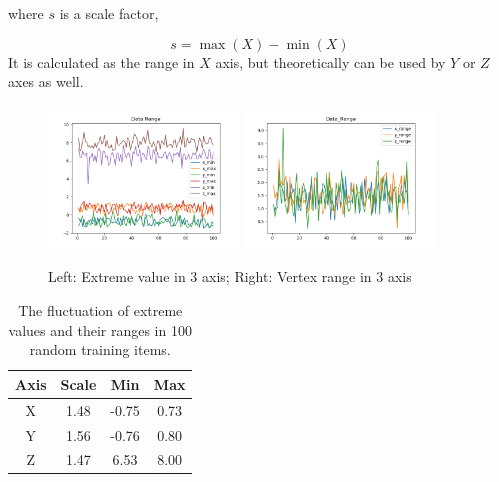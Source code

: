 \documentclass[border=15pt, multi, tikz]{article}
\newcommand{\tabhead}[1]{\textbf{#1}}
\begin{document}
where $ s $ is a scale factor, 

\begin{dmath*}
	s = \max(X)-\min(X)
\end{dmath*}
It is calculated as the range in $ X $ axis, but theoretically can be used by $ Y $ or $ Z $ axes as well.

\begin{figure}[!h]
	\centering
	{\includegraphics[width=0.45\textwidth]{./Figures/Data_Extreme.png}}
	{\includegraphics[width=0.45\textwidth]{./Figures/Data_Range.png}}
	\label{fig:data_range}
	\caption{Left: Extreme value in 3 axis; Right: Vertex range in 3 axis}
\end{figure}

\begin{table}[h!]
	\caption{ The fluctuation of extreme values and their ranges in 100 random training items. 
	}
	\label{tab:data-range}
	\centering
	\begin{tabular}{c | c c c}
		\hline 
		\tabhead{Axis} & \tabhead{Scale} & \tabhead{Min} & \tabhead{Max}\\
		\hline 
		X & 1.48 & -0.75 & 0.73\\
		\hline 
		Y & 1.56 & -0.76 & 0.80\\
		\hline 
		Z & 1.47 & 6.53 & 8.00\\
		\hline 

	\end{tabular}
\end{table}
\end{document}
